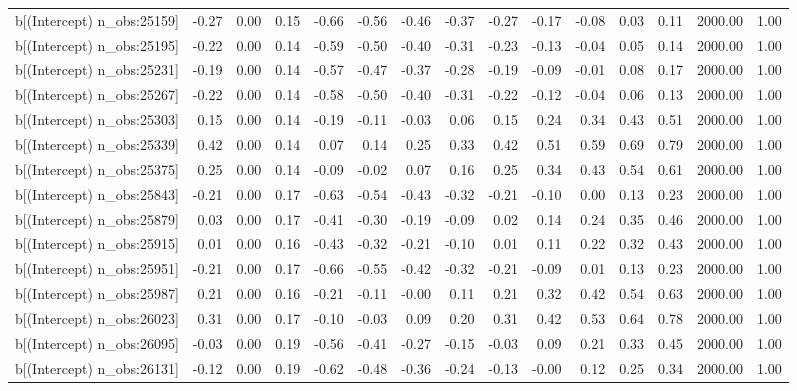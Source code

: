 \begin{table}[ht]
\begin{tabular}{rrrrrrrrrrrrrrr}
  b[(Intercept) n\_obs:25159] & -0.27 & 0.00 & 0.15 & -0.66 & -0.56 & -0.46 & -0.37 & -0.27 & -0.17 & -0.08 & 0.03 & 0.11 & 2000.00 & 1.00 \\ 
  b[(Intercept) n\_obs:25195] & -0.22 & 0.00 & 0.14 & -0.59 & -0.50 & -0.40 & -0.31 & -0.23 & -0.13 & -0.04 & 0.05 & 0.14 & 2000.00 & 1.00 \\ 
  b[(Intercept) n\_obs:25231] & -0.19 & 0.00 & 0.14 & -0.57 & -0.47 & -0.37 & -0.28 & -0.19 & -0.09 & -0.01 & 0.08 & 0.17 & 2000.00 & 1.00 \\ 
  b[(Intercept) n\_obs:25267] & -0.22 & 0.00 & 0.14 & -0.58 & -0.50 & -0.40 & -0.31 & -0.22 & -0.12 & -0.04 & 0.06 & 0.13 & 2000.00 & 1.00 \\ 
  b[(Intercept) n\_obs:25303] & 0.15 & 0.00 & 0.14 & -0.19 & -0.11 & -0.03 & 0.06 & 0.15 & 0.24 & 0.34 & 0.43 & 0.51 & 2000.00 & 1.00 \\ 
  b[(Intercept) n\_obs:25339] & 0.42 & 0.00 & 0.14 & 0.07 & 0.14 & 0.25 & 0.33 & 0.42 & 0.51 & 0.59 & 0.69 & 0.79 & 2000.00 & 1.00 \\ 
  b[(Intercept) n\_obs:25375] & 0.25 & 0.00 & 0.14 & -0.09 & -0.02 & 0.07 & 0.16 & 0.25 & 0.34 & 0.43 & 0.54 & 0.61 & 2000.00 & 1.00 \\ 
  b[(Intercept) n\_obs:25843] & -0.21 & 0.00 & 0.17 & -0.63 & -0.54 & -0.43 & -0.32 & -0.21 & -0.10 & 0.00 & 0.13 & 0.23 & 2000.00 & 1.00 \\ 
  b[(Intercept) n\_obs:25879] & 0.03 & 0.00 & 0.17 & -0.41 & -0.30 & -0.19 & -0.09 & 0.02 & 0.14 & 0.24 & 0.35 & 0.46 & 2000.00 & 1.00 \\ 
  b[(Intercept) n\_obs:25915] & 0.01 & 0.00 & 0.16 & -0.43 & -0.32 & -0.21 & -0.10 & 0.01 & 0.11 & 0.22 & 0.32 & 0.43 & 2000.00 & 1.00 \\ 
  b[(Intercept) n\_obs:25951] & -0.21 & 0.00 & 0.17 & -0.66 & -0.55 & -0.42 & -0.32 & -0.21 & -0.09 & 0.01 & 0.13 & 0.23 & 2000.00 & 1.00 \\ 
  b[(Intercept) n\_obs:25987] & 0.21 & 0.00 & 0.16 & -0.21 & -0.11 & -0.00 & 0.11 & 0.21 & 0.32 & 0.42 & 0.54 & 0.63 & 2000.00 & 1.00 \\ 
  b[(Intercept) n\_obs:26023] & 0.31 & 0.00 & 0.17 & -0.10 & -0.03 & 0.09 & 0.20 & 0.31 & 0.42 & 0.53 & 0.64 & 0.78 & 2000.00 & 1.00 \\ 
  b[(Intercept) n\_obs:26095] & -0.03 & 0.00 & 0.19 & -0.56 & -0.41 & -0.27 & -0.15 & -0.03 & 0.09 & 0.21 & 0.33 & 0.45 & 2000.00 & 1.00 \\ 
  b[(Intercept) n\_obs:26131] & -0.12 & 0.00 & 0.19 & -0.62 & -0.48 & -0.36 & -0.24 & -0.13 & -0.00 & 0.12 & 0.25 & 0.34 & 2000.00 & 1.00 \\ 

\end{tabular}
\end{table}
